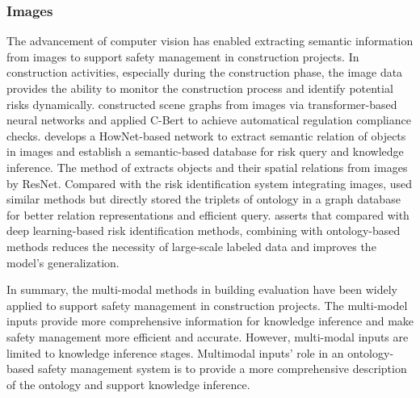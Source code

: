 \subsubsection*{Images}
The advancement of computer vision has enabled extracting semantic information from images to support safety management in construction projects.
In construction activities, especially during the construction phase, the image data provides the ability to monitor the construction process and identify potential risks dynamically.
\cite{zhang2022automatic} constructed scene graphs from images via transformer-based neural networks and applied C-Bert to achieve automatical regulation compliance checks.
\cite{zhong2020ontology} develops a HowNet-based network to extract semantic relation of objects in images and establish a semantic-based database for 
risk query and knowledge inference. 
The method of \cite{fang2020knowledge} extracts objects and their spatial relations from images by ResNet. Compared with the risk identification system integrating images, \cite{fang2020knowledge} used similar methods but directly stored the triplets of ontology in a graph database for better relation representations and efficient query. 
\cite{lee2023ontological} asserts that compared with deep learning-based risk identification methods, combining with ontology-based methods reduces the necessity of large-scale labeled data and improves the model's generalization.

In summary, the multi-modal methods in building evaluation have been widely applied to support safety management in construction projects.  
The multi-model inputs provide more comprehensive information for knowledge inference and make safety management more efficient and accurate.
However, multi-modal inputs are limited to knowledge inference stages. 
Multimodal inputs' role in an ontology-based safety management system is to provide a more comprehensive description of the ontology and support knowledge inference.